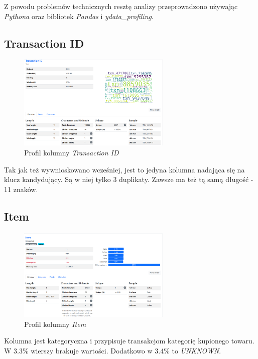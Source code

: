 \documentclass[a4paper,12pt]{article}
\begin{document}
Z powodu problemów technicznych resztę analizy przeprowadzono używając \textit{Pythona} oraz bibliotek \textit{Pandas} i \textit{ydata\_profiling}.

\subsection{Transaction ID}

\begin{figure}[H]
  \centering
  \includegraphics[width=0.65\textwidth]{images/py_1.png}
  \caption{Profil kolumny \textit{Transaction ID}}
\end{figure}

Tak jak też wywnioskowano wcześniej, jest to jedyna kolumna nadająca się na klucz kandydujący. Są w niej tylko 3 duplikaty. Zawsze ma też tą samą długość - 11 znaków.

\subsection{Item}

\begin{figure}[H]
  \centering
  \includegraphics[width=0.65\textwidth]{images/py_2.png}
  \caption{Profil kolumny \textit{Item}}
\end{figure}

Kolumna jest kategoryczna i przypisuje transakcjom kategorię kupionego towaru. W 3.3\% wierszy brakuje wartości. Dodatkowo w 3.4\% to \textit{UNKNOWN}. 
\end{document}

